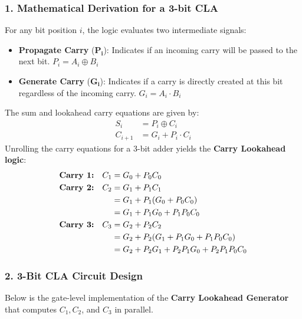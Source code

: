 \documentclass[12pt,a3paper]{article}
\begin{document}
\begin{enumerate}
\begin{tcolorbox}[enhanced,breakable,ansbox,colback=cD!4,colframe=cD,boxrule=0.8pt,arc=5pt,title={\textbf{Answer}},fonttitle=\bfseries\color{white},colbacktitle=cD]
\subsubsection*{1. Mathematical Derivation for a 3-bit CLA}
For any bit position $i$, the logic evaluates two intermediate signals:
\begin{itemize}
    \item \textbf{Propagate Carry} ($\mathbf{P_i}$): Indicates if an incoming carry will be passed to the next bit. $P_i = A_i \oplus B_i$
    \item \textbf{Generate Carry} ($\mathbf{G_i}$): Indicates if a carry is directly created at this bit regardless of the incoming carry. $G_i = A_i \cdot B_i$
\end{itemize}
The sum and lookahead carry equations are given by:
\begin{align*}
    S_i &= P_i \oplus C_i \\
    C_{i+1} &= G_i + P_i \cdot C_i
\end{align*}
Unrolling the carry equations for a 3-bit adder yields the \textbf{Carry Lookahead logic}:
\begin{align*}
    \text{\textbf{Carry 1:}} \quad C_1 &= G_0 + P_0C_0 \\
    \text{\textbf{Carry 2:}} \quad C_2 &= G_1 + P_1C_1 \\
                                       &= G_1 + P_1(G_0 + P_0C_0) \\
                                       &= G_1 + P_1G_0 + P_1P_0C_0 \\
    \text{\textbf{Carry 3:}} \quad C_3 &= G_2 + P_2C_2 \\
                                       &= G_2 + P_2(G_1 + P_1G_0 + P_1P_0C_0) \\
                                       &= G_2 + P_2G_1 + P_2P_1G_0 + P_2P_1P_0C_0
\end{align*}

\vspace{0.5cm}
\subsubsection*{2. 3-Bit CLA Circuit Design}
Below is the gate-level implementation of the \textbf{Carry Lookahead Generator} that computes $C_1, C_2$, and $C_3$ in parallel.

\begin{center}
\begin{circuitikz}[scale=0.9, transform shape, thick]
    

\end{circuitikz}
\end{center}
\end{tcolorbox}
\end{enumerate}
\end{document}
